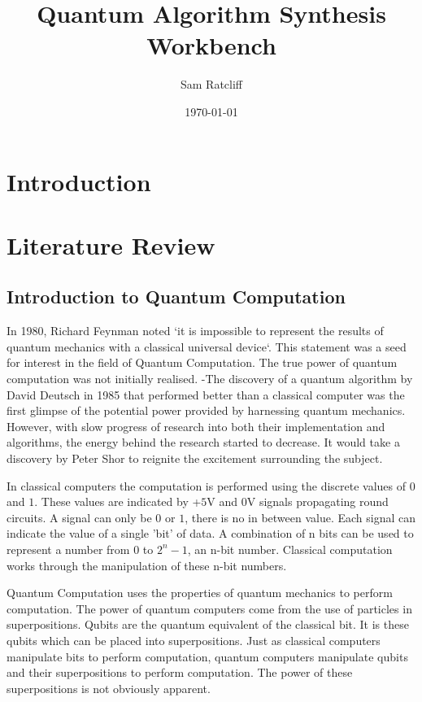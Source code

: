 \documentclass[authoryearcitations]{UoYCSproject}
\author{Sam Ratcliff}
\title{Quantum Algorithm Synthesis Workbench}
\date{\today}
\begin{document}
\maketitle
\listoffigures
\listoftables
\chapter{Introduction}
 \setcounter{page}{0} 
\chapter{Literature Review}
\section{Introduction to Quantum Computation}
In 1980, Richard Feynman noted `it is impossible to represent the results of quantum mechanics with a classical universal device`\cite{Feynman82simulatingphysics}.
This statement was a seed for interest in the field of Quantum Computation.
The true power of quantum computation was not initially realised.
-The discovery of a quantum algorithm by David Deutsch\cite{Deutsch1985} in 1985 that performed better than a classical computer was the first glimpse of the potential power provided by harnessing quantum mechanics.
However, with slow progress of research into both their implementation and algorithms, the energy behind the research started to decrease.
It would take a discovery by Peter Shor\cite{Shor:1994jg} to reignite the excitement surrounding the subject.  

In classical computers the computation is performed using the discrete values of $0$ and $1$.
These values are indicated by +$5$V and $0$V signals propagating round circuits.
A signal can only be $0$ or $1$, there is no in between value.
Each signal can indicate the value of a single 'bit' of data.
A combination of n bits can be used to represent a number from $0$ to $2^n-1$, an n-bit number.
Classical computation works through the manipulation of these n-bit numbers.


Quantum Computation uses the properties of quantum mechanics to perform computation.
The power of quantum computers come from the use of particles in superpositions.
Qubits are the quantum equivalent of the classical bit.
It is these qubits which can be placed into superpositions.
Just as classical computers manipulate bits to perform computation, quantum computers manipulate qubits and their superpositions to perform computation.
The power of these superpositions is not obviously apparent.
\end{document}
